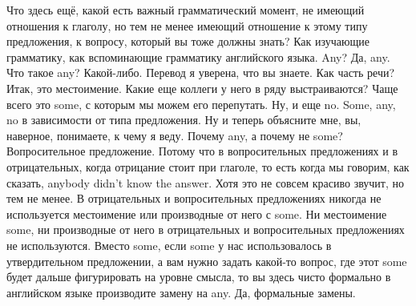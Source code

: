 \documentclass[main.tex]{subfiles}
\begin{document}
Что здесь ещё, какой есть важный грамматический момент, не имеющий отношения к глаголу, но тем не менее имеющий отношение к этому типу предложения, к вопросу, который вы тоже должны знать?
Как изучающие грамматику, как вспоминающие грамматику английского языка.
Any?
Да, any.
Что такое any?
Какой-либо.
Перевод я уверена, что вы знаете.
Как часть речи?
Итак, это местоимение.
Какие еще коллеги у него в ряду выстраиваются?
Чаще всего это some, с которым мы можем его перепутать.
Ну, и еще no.
Some, any, no в зависимости от типа предложения.
Ну и теперь объясните мне, вы, наверное, понимаете, к чему я веду.
Почему any, а почему не some?
Вопросительное предложение.
Потому что в вопросительных предложениях и в отрицательных, когда отрицание стоит при глаголе, то есть когда мы говорим, как сказать, anybody didn't know the answer.
Хотя это не совсем красиво звучит, но тем не менее.
В отрицательных и вопросительных предложениях никогда не используется местоимение или производные от него с some.
Ни местоимение some, ни производные от него в отрицательных и вопросительных предложениях не используются.
Вместо some, если some у нас использовалось в утвердительном предложении, а вам нужно задать какой-то вопрос, где этот some будет дальше фигурировать на уровне смысла, то вы здесь чисто формально в английском языке производите замену на any.
Да, формальные замены.
\end{document}
